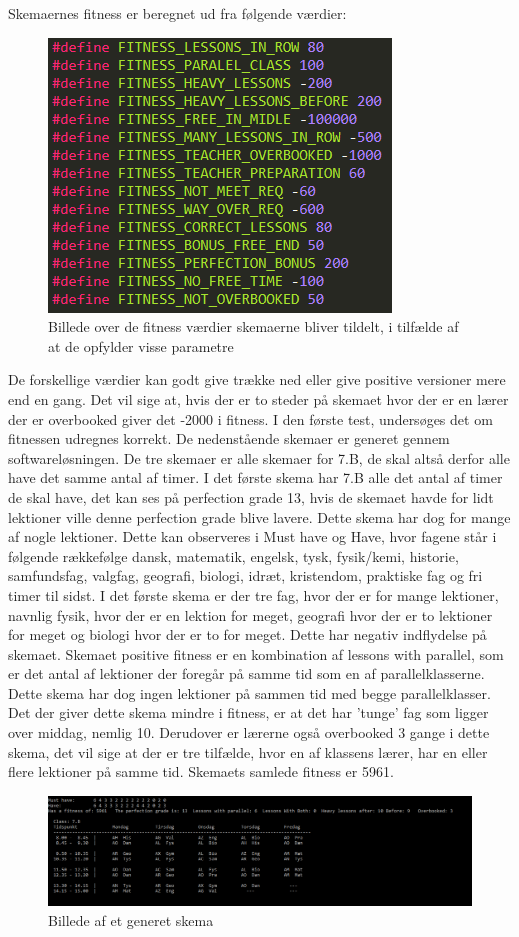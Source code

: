 Skemaernes fitness er beregnet ud fra følgende værdier:
\begin{figure}[!h]
\includegraphics{partials/graphics/fitness.png}
\caption{Billede over de fitness værdier skemaerne bliver tildelt, i tilfælde af at de opfylder visse parametre}
\label{fitnessvalues}
\end{figure}
De forskellige værdier kan godt give trække ned eller give positive versioner mere end en gang. Det vil sige at, hvis der er to steder på skemaet hvor der er en lærer der er overbooked giver det -2000 i fitness.
I den første test, undersøges det om fitnessen udregnes korrekt. De nedenstående skemaer er generet gennem softwareløsningen. De tre skemaer er alle skemaer for 7.B, de skal altså derfor alle have det samme antal af timer. 
I det første skema har 7.B alle det antal af timer de skal have, det kan ses på perfection grade 13, hvis de skemaet havde for lidt lektioner ville denne perfection grade blive lavere. Dette skema har dog for mange af nogle lektioner. Dette kan observeres i Must have og Have, hvor fagene står i følgende rækkefølge dansk, matematik, engelsk, tysk, fysik/kemi, historie, samfundsfag, valgfag, geografi, biologi, idræt, kristendom, praktiske fag og fri timer til sidst. I det første skema er der tre fag, hvor der er for mange lektioner, navnlig fysik, hvor der er en lektion for meget, geografi hvor der er to lektioner for meget og biologi hvor der er to for meget. Dette har negativ indflydelse på skemaet.
Skemaet positive fitness er en kombination af lessons with parallel, som er det antal af lektioner der foregår på samme tid som en af parallelklasserne. Dette skema har dog ingen lektioner på sammen tid med begge parallelklasser. Det der giver dette skema mindre i fitness, er at det har ’tunge’ fag som ligger over middag, nemlig 10. Derudover er lærerne også overbooked 3 gange i dette skema, det vil sige at der er tre tilfælde, hvor en af klassens lærer, har en eller flere lektioner på samme tid. Skemaets samlede fitness er 5961. 
\begin{figure}[!h]
\includegraphics{partials/graphics/fitness1.png}
\caption{Billede af et generet skema}
\label{fitness1}
\end{figure}

